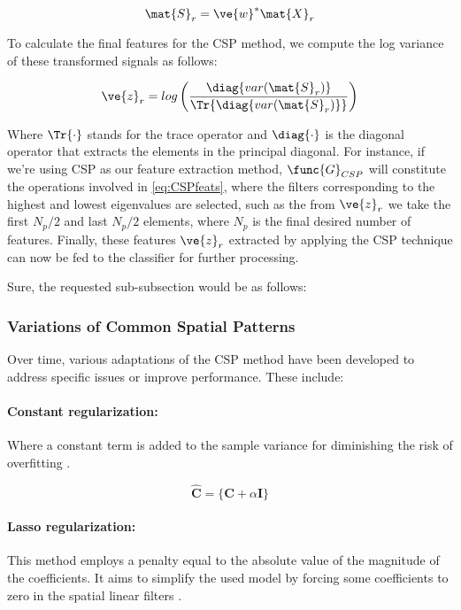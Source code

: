 \begin{equation}
\mat{S}_r = \ve{w}^* \mat{X}_r     
\end{equation}

To calculate the final features for the CSP method, we compute the log variance of these transformed signals as follows:

\begin{equation}\label{eq:CSPfeats}
\ve{z}_r = log \left( \frac{\diag{var({\mat{S}}_{r})}}{\Tr{\diag{var(\mat{S}_{r})}}}  \right)  
\end{equation}

Where $\Tr{\cdot}$ stands for the trace operator and $\diag{\cdot}$ is the diagonal operator that extracts the elements in the principal diagonal. For instance, if we're using CSP as our feature extraction method, $\func{G}_{CSP}$ will constitute the operations involved in \eqref{eq:CSPfeats}, where the filters corresponding to the highest and lowest eigenvalues are selected, such as the from $\ve{z}_r$ we take the first $N_p/2$ and last $N_p/2$ elements, where $N_p$ is the final desired number of features. Finally, these features $\ve{z}_r$ extracted by applying the CSP technique can now be fed to the classifier for further processing.

Sure, the requested sub-subsection would be as follows:

\subsubsection{Variations of Common Spatial Patterns}

Over time, various adaptations of the CSP method have been developed to address specific issues or improve performance. These include:

\paragraph{Constant regularization:} Where a constant term is added to the sample variance for diminishing the risk of overfitting \cite{park2017filter}.

\begin{equation}
    \hat{\mathbf{C}}=\{\mathbf{C}+\alpha \mathbf{I}\}
\end{equation}

\paragraph{Lasso regularization:} This method employs a penalty equal to the absolute value of the magnitude of the coefficients. It aims to simplify the used model by forcing some coefficients to zero in the spatial linear filters \cite{zhang2018new}.

